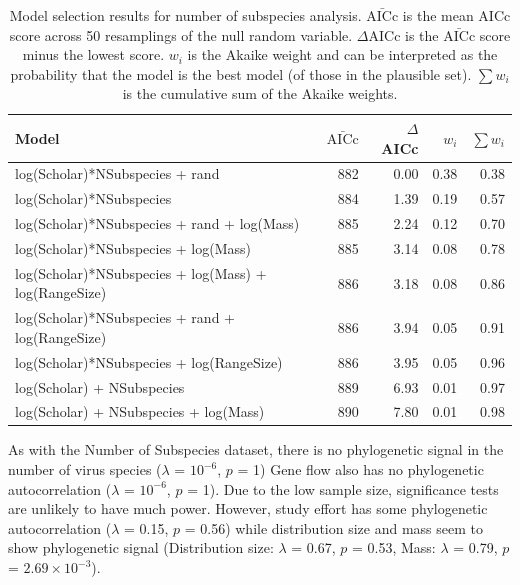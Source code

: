 \begin{table}[t]
\caption[Model selection results for number of subspecies analysis]{
Model selection results for number of subspecies analysis. 
$\bar{\text{AICc}}$ is the mean AICc score across 50 resamplings of the null random variable. 
$\Delta$AICc is the $\bar{\text{AICc}}$ score minus the lowest score. 
$w_i$ is the Akaike weight and can be interpreted as the probability that the model is the best model (of those in the plausible set).
$\sum w_i$ is the cumulative sum of the Akaike weights.
}

\begin{tabular}{@{}>{\small}lrrrr@{}}
\toprule
\normalsize{Model} & $\bar{\text{AICc}}$ & $\Delta$AICc & $w_i$ & $\sum w_i$\\
\midrule
log(Scholar)*NSubspecies + rand & 
882 & 0.00 &
0.38 & 0.38\\
log(Scholar)*NSubspecies & 
884 & 1.39 &
0.19 & 0.57\\
log(Scholar)*NSubspecies + rand + log(Mass) & 
885 & 2.24 &
0.12 & 0.70\\
log(Scholar)*NSubspecies  + log(Mass) & 
885 & 3.14 &
0.08 & 0.78\\
log(Scholar)*NSubspecies  + log(Mass) + log(RangeSize) & 
886 & 3.18 &
0.08 & 0.86\\
log(Scholar)*NSubspecies  + rand + log(RangeSize) & 
886 & 3.94 &
0.05 & 0.91\\
log(Scholar)*NSubspecies  + log(RangeSize) & 
886 & 3.95 &
0.05 & 0.96\\
log(Scholar) + NSubspecies & 
889 & 6.93 &
0.01 & 0.97\\
log(Scholar) + NSubspecies + log(Mass) & 
890 & 7.80 &
0.01 & 0.98\\
\bottomrule
\end{tabular}

\label{t:subsmodels}
\end{table}

As with the Number of Subspecies dataset, there is no phylogenetic signal in the number of virus species ($\lambda$ = \ensuremath{10^{-6}}, $p$ = 1)
Gene flow also has no phylogenetic autocorrelation ($\lambda$ = \ensuremath{10^{-6}}, $p$ = 1).
Due to the low sample size, significance tests are unlikely to have much power.
However, study effort has some phylogenetic autocorrelation ($\lambda$ = 0.15, $p$ = 0.56) while distribution size and mass seem to show phylogenetic signal (Distribution size: $\lambda$ = 0.67, $p$ = 0.53, Mass: $\lambda$ = 0.79, $p$ = \ensuremath{2.69\times 10^{-3}}).


